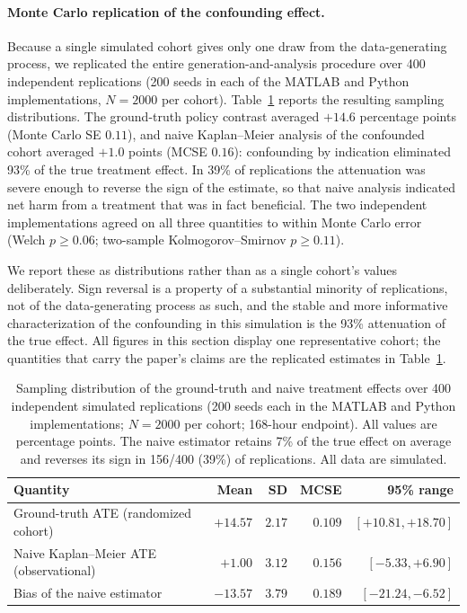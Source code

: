 \paragraph{Monte Carlo replication of the confounding effect.}
Because a single simulated cohort gives only one draw from the data-generating process, we replicated
the entire generation-and-analysis procedure over 400 independent replications (200 seeds in each of
the MATLAB and Python implementations, $N = 2000$ per cohort). Table~\ref{tab:multiseed} reports the
resulting sampling distributions. The ground-truth policy contrast averaged $+14.6$ percentage points
(Monte Carlo SE $0.11$), and naive Kaplan--Meier analysis of the confounded cohort averaged $+1.0$
points (MCSE $0.16$): confounding by indication eliminated 93\% of the true treatment effect. In
39\% of replications the attenuation was severe enough to reverse the sign of the estimate, so that
naive analysis indicated net harm from a treatment that was in fact beneficial. The two independent
implementations agreed on all three quantities to within Monte Carlo error (Welch $p \geq 0.06$;
two-sample Kolmogorov--Smirnov $p \geq 0.11$).

We report these as distributions rather than as a single cohort's values deliberately. Sign reversal
is a property of a substantial minority of replications, not of the data-generating process as such,
and the stable and more informative characterization of the confounding in this simulation is the
93\% attenuation of the true effect. All figures in this section display one representative cohort;
the quantities that carry the paper's claims are the replicated estimates in
Table~\ref{tab:multiseed}.

\begin{table}[htbp]
\centering
\begin{tabular}{lrrrr}
\toprule
Quantity & Mean & SD & MCSE & 95\% range \\
\midrule
Ground-truth ATE (randomized cohort)   & $+14.57$ & $2.17$ & $0.109$ & $[+10.81, +18.70]$ \\
Naive Kaplan--Meier ATE (observational) & $+1.00$  & $3.12$ & $0.156$ & $[-5.33, +6.90]$ \\
Bias of the naive estimator             & $-13.57$ & $3.79$ & $0.189$ & $[-21.24, -6.52]$ \\
\bottomrule
\end{tabular}
\caption{Sampling distribution of the ground-truth and naive treatment effects over 400 independent
simulated replications (200 seeds each in the MATLAB and Python implementations; $N=2000$ per cohort;
168-hour endpoint). All values are percentage points. The naive estimator retains 7\% of the true
effect on average and reverses its sign in 156/400 (39\%) of replications. All data are simulated.}
\label{tab:multiseed}
\end{table}

